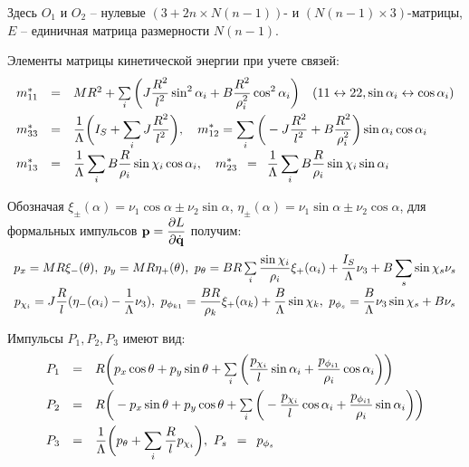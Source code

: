 Здесь $O_1$ и $O_2$ -- нулевые $(3+2n \times N(n-1))$- и $(N(n-1) \times 3)$-матрицы, $E$ -- единичная матрица размерности $N(n-1)$.

Элементы матрицы кинетической энергии при учете связей:
\begin{equation}\label{mstar}
    \begin{array}{rcl}
        m^*_{11} & = & MR^2 + \sum\limits_i \bigg( J\ddfrac{R^2}{l^2}\sin^2\alpha_i + B\ddfrac{R^2}{\rho_i^2}\cos^2\alpha_i\bigg)\quad(11 \leftrightarrow 22, \sin\alpha_i \leftrightarrow \cos\alpha_i)\vsp
        m^*_{33} & = & \ddfrac{1}{\Lambda}\bigg(I_S + \sum\limits_i J\ddfrac{R^2}{l^2}\bigg),\quad
        m^*_{12}  =  \sum\limits_i \bigg(-J\ddfrac{R^2}{l^2} + B\ddfrac{R^2}{\rho_i^2}\bigg)\sin\alpha_i\cos\alpha_i\vsp
        m^*_{13} & = & \ddfrac{1}{\Lambda}\sum\limits_i B\ddfrac{R}{\rho_i}\sin\chi_i\cos\alpha_i,
        \quad
        m^*_{23} \enspace = \enspace \ddfrac{1}{\Lambda}\sum\limits_i B\ddfrac{R}{\rho_i}\sin\chi_i\sin\alpha_i
    \end{array}
\end{equation}

Обозначая $\xi_\pm(\alpha) = \nu_1\cos\alpha \pm \nu_2\sin\alpha$, $\eta_\pm(\alpha) = \nu_1\sin\alpha \pm \nu_2\cos\alpha$, для формальных импульсов $\boldsymbol{\mathbf{p}} = \displaystyle\frac{\displaystyle \partial L}{\displaystyle \partial \dot{\boldsymbol{\mathbf{q}}}}$ получим:
\begin{equation}\label{p}
    \begin{array}{c}
        p_x  =  MR\xi_-(\theta), \ p_y = MR\eta_+(\theta),\ 
        p_\theta  =  BR\sum\limits_i\ddfrac{\sin\chi_i}{\rho_i}\xi_+(\alpha_i) + \ddfrac{I_S}{\Lambda}\nu_3 + B\sum\limits_s\sin\chi_s\nu_s\vsp
        p_{\chi_i}  =  J\ddfrac{R}{l}(\eta_-(\alpha_i) - \ddfrac{1}{\Lambda}\nu_3), \ p_{\phi_{k1}}  =  \ddfrac{BR}{\rho_k}\xi_+(\alpha_k)+\ddfrac{B}{\Lambda}\sin\chi_k,\ %
        p_{\phi_s}  =  \ddfrac{B}{\Lambda}\nu_3\sin\chi_s + B\nu_s
    \end{array}
\end{equation}

Импульсы $P_1, P_2, P_3$ имеют вид:
\begin{equation}\label{bigP}
    \begin{array}{rcl}
        P_1 & = & R\bigg(p_x\cos\theta + p_y\sin\theta + \sum\limits_{i}\bigg(\ddfrac{p_{\chi_i}}{l}\sin\alpha_i +  \ddfrac{p_{\phi_{i1}}}{\rho_i}\cos\alpha_i\bigg)\bigg)\vsp
        P_2 & = & R\bigg(-p_x\sin\theta + p_y\cos\theta + \sum\limits_{i}\bigg(-\ddfrac{p_{\chi_i}}{l}\cos\alpha_i +  \ddfrac{p_{\phi_{i1}}}{\rho_i}\sin\alpha_i\bigg)\bigg)\vsp
        P_3 & = & \ddfrac{1}{\Lambda}\bigg(p_\theta + \sum\limits_{i}\ddfrac{R}{l}p_{\chi_i}\bigg),\ 
        P_s \enspace = \enspace p_{\phi_s}
    \end{array}
\end{equation}

